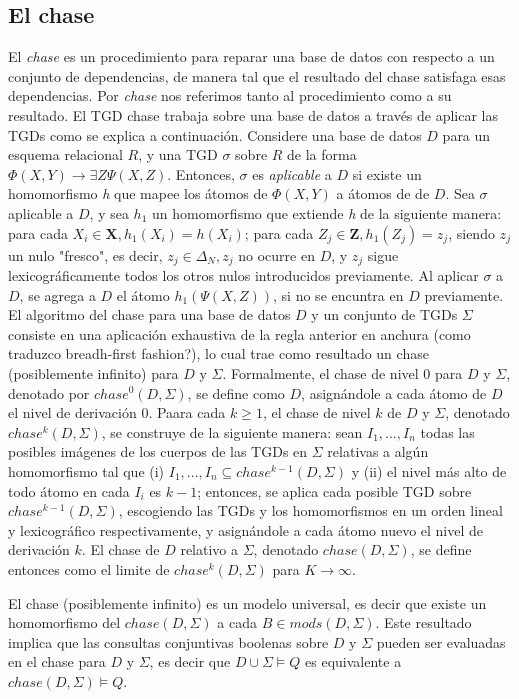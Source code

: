 \documentclass[11pt,a4paper,twoside]{tesis}
\begin{document}
\subsection{El chase}

El \textit{chase} es un procedimiento para reparar una base de datos con respecto a un conjunto de dependencias, de manera tal que el resultado del chase satisfaga esas dependencias. Por \textit{chase} nos referimos tanto al procedimiento como a su resultado. El TGD chase trabaja sobre una base de datos a través de aplicar las TGDs como se explica a continuación. Considere una base de datos $D$ para un esquema relacional $R$, y una TGD $\sigma$ sobre $R$ de la forma $\Phi (X, Y) \rightarrow \exists Z \Psi (X, Z)$. Entonces, $\sigma$ es \textit{aplicable} a $D$ si existe un homomorfismo \textit{h} que mapee los átomos de $\Phi (X, Y)$ a átomos de  de $D$. Sea $\sigma$ aplicable a $D$, y sea $h_1$ un homomorfismo que extiende \textit{h} de la siguiente manera: para cada $X_i \in \textbf{X}, h_1(X_i) = h(X_i)$; para cada $Z_j \in \textbf{Z}, h_1(Z_j) = z_j$, siendo $z_j$ un nulo "fresco", es decir, $z_j \in \Delta_N, z_j$ no ocurre en $D$, y $z_j$ sigue lexicográficamente todos los otros nulos introducidos previamente. Al aplicar $\sigma$ a $D$, se agrega a $D$ el átomo $h_1(\Psi (X, Z))$, si no se encuntra en $D$ previamente.
El algoritmo del chase para una base de datos $D$ y un conjunto de TGDs $\Sigma$ consiste en una aplicación exhaustiva de la regla anterior en anchura (como traduzco breadh-first fashion?), lo cual trae como resultado un chase (posiblemente infinito) para $D$ y $\Sigma$. Formalmente, el chase de nivel 0 para $D$ y $\Sigma$, denotado por $chase^0(D,\Sigma)$, se define como $D$, asignándole a cada átomo de $D$ el nivel de derivación 0. Paara cada $k \geq 1$, el chase de nivel $k$ de $D$ y $\Sigma$, denotado $chase^k(D, \Sigma)$, se construye de la siguiente manera: sean $I_1,...,I_n$ todas las posibles imágenes de los cuerpos de las TGDs en $\Sigma$ relativas a algún homomorfismo tal que (i) $I_1,...,I_n \subseteq chase^{k-1}(D,\Sigma)$ y (ii) el nivel más alto de todo átomo en cada $I_i$ es $k - 1$; entonces, se aplica cada posible TGD sobre $chase^{k-1}(D,\Sigma)$, escogiendo las TGDs y los homomorfismos en un orden lineal y lexicográfico respectivamente, y asignándole a cada átomo nuevo el nivel de derivación $k$. El chase de $D$ relativo a $\Sigma$, denotado $chase(D,\Sigma)$, se define entonces como el limite de $chase^k(D,\Sigma)$ para $K \rightarrow \infty$. 

El chase (posiblemente infinito) es un modelo universal, es decir que existe un homomorfismo del $chase(D, \Sigma)$ a cada $B \in mods(D,\Sigma)$. Este resultado implica que las consultas conjuntivas boolenas sobre $D$ y $\Sigma$ pueden ser evaluadas en el chase para $D$ y $\Sigma$, es decir que $D \cup \Sigma \models Q$ es equivalente a $chase(D, \Sigma) \models Q$. 
\end{document}
